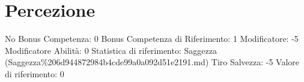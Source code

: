 \section{Percezione}\label{percezione}

\begin{description}
\tightlist
\item[Tags: ABI]
No Bonus Competenza: 0 Bonus Competenza di Riferimento: 1 Modificatore:
-5 Modificatore Abilità: 0 Statistica di riferimento: Saggezza
(Saggezza\%206d944872984b4cde99a0a092d51e2191.md) Tiro Salvezza: -5
Valore di riferimento: 0
\end{description}
